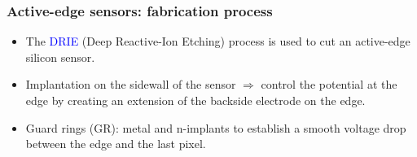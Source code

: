 \begin{frame}
  \frametitle{Active-edge sensors: fabrication process}

  \begin{itemize}
  \item The \textcolor{Blue}{DRIE} (Deep Reactive-Ion Etching) process
    is used to cut an active-edge silicon sensor.
  \item Implantation on the sidewall of the sensor $\Rightarrow$
    control the potential at the edge by creating an extension of the
    backside electrode on the edge.
  \item Guard rings (GR): metal and n-implants to establish a smooth
    voltage drop between the edge and the last pixel.
  \end{itemize}

  \begin{columns}

\end{columns}
\end{frame}
